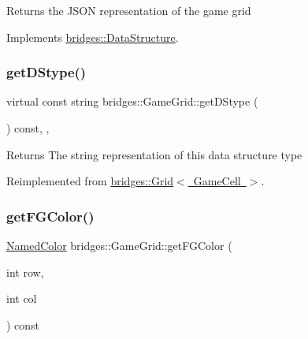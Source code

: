 \begin{DoxyReturn}{Returns}
the J\+S\+ON representation of the game grid 
\end{DoxyReturn}


Implements \mbox{\hyperlink{classbridges_1_1_data_structure}{bridges\+::\+Data\+Structure}}.

\mbox{\label{classbridges_1_1_game_grid_a668f4f82739798f808a9f0b582d49dac}} 
\subsubsection{\texorpdfstring{getDStype()}{getDStype()}}
{\footnotesize\ttfamily virtual const string bridges\+::\+Game\+Grid\+::get\+D\+Stype (\begin{DoxyParamCaption}{ }\end{DoxyParamCaption}) const\hspace{0.3cm}{\ttfamily [inline]}, {\ttfamily [override]}, {\ttfamily [virtual]}}

\begin{DoxyReturn}{Returns}
The string representation of this data structure type 
\end{DoxyReturn}


Reimplemented from \mbox{\hyperlink{classbridges_1_1_grid_ab701d081de4f7ffafb15966758dd5446}{bridges\+::\+Grid$<$ Game\+Cell $>$}}.

\mbox{\label{classbridges_1_1_game_grid_af67d9a674e35ed54fff39cd4b0c6ce3a}} 
\subsubsection{\texorpdfstring{getFGColor()}{getFGColor()}}
{\footnotesize\ttfamily \mbox{\hyperlink{namespacebridges_ad811207d8898a7fd6b72a74725e68357}{Named\+Color}} bridges\+::\+Game\+Grid\+::get\+F\+G\+Color (\begin{DoxyParamCaption}\item[{int}]{row,  }\item[{int}]{col }\end{DoxyParamCaption}) const\hspace{0.3cm}{\ttfamily [inline]}}

